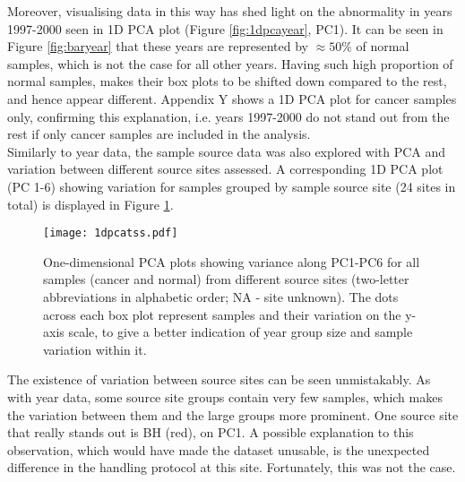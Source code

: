     Moreover, visualising data in this way has shed light on the abnormality in years 1997-2000 seen in 1D PCA plot (Figure \ref{fig:1dpcayear}, PC1). It can be seen in Figure \ref{fig:baryear} that these years are represented by $\approx50\%$ of normal samples, which is not the case for all other years. Having such high proportion of normal samples, makes their box plots to be shifted down compared to the rest, and hence appear different. Appendix Y shows a 1D PCA plot for cancer samples only, confirming this explanation, i.e. years 1997-2000 do not stand out from the rest if only cancer samples are included in the analysis. \\
    
    \newpage
    Similarly to year data, the sample source data was also explored with PCA and variation between different source sites assessed. A corresponding 1D PCA plot (PC 1-6) showing variation for samples grouped by sample source site (24 sites in total) is displayed in Figure \ref{fig:1dpcatss}. \\
    \newline
    
            
            \begin{figure}[!h]
            \centering
            \texttt{[image: 1dpcatss.pdf]}
            \caption[1D PCA plot based on sample source site data]{One-dimensional PCA plots showing variance along PC1-PC6 for all samples (cancer and normal) from different source sites (two-letter abbreviations in alphabetic order; NA - site unknown). The dots across each box plot represent samples and their variation on the y-axis scale, to give a better indication of year group size and sample variation within it.}
            \label{fig:1dpcatss}
            \end{figure}
            
            
  
    The existence of variation between source sites can be seen unmistakably. As with year data, some source site groups contain very few samples, which makes the variation between them and the large groups more prominent. One source site that really stands out is BH (red), on PC1. A possible explanation to this observation, which would have made the dataset unusable, is the unexpected difference in the handling protocol at this site. Fortunately, this was not the case.  \\
    


